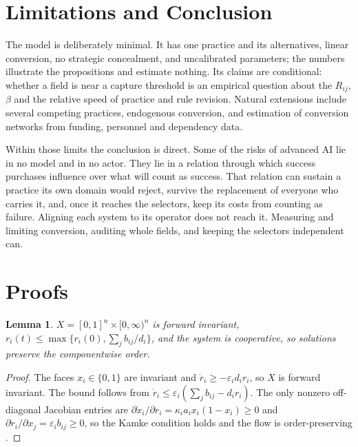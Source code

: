 \documentclass[letterpaper]{article} %
\newtheorem{lemma}{Lemma}
\theoremstyle{definition}
\begin{document}
\section{Limitations and Conclusion}

The model is deliberately minimal. It has one practice and its alternatives, linear conversion, no strategic concealment, and uncalibrated parameters; the numbers illustrate the propositions and estimate nothing. Its claims are conditional: whether a field is near a capture threshold is an empirical question about the $R_{ij}$, $\beta$ and the relative speed of practice and rule revision. Natural extensions include several competing practices, endogenous conversion, and estimation of conversion networks from funding, personnel and dependency data.

Within those limits the conclusion is direct. Some of the risks of advanced AI lie in no model and in no actor. They lie in a relation through which success purchases influence over what will count as success. That relation can sustain a practice its own domain would reject, survive the replacement of everyone who carries it, and, once it reaches the selectors, keep its costs from counting as failure. Aligning each system to its operator does not reach it. Measuring and limiting conversion, auditing whole fields, and keeping the selectors independent can.



\appendix

\section{Proofs}\label{app:proofs}

\begin{lemma}\label{lem:basic}
$X=[0,1]^n\times[0,\infty)^n$ is forward invariant, $r_i(t)\le\max\{r_i(0),\sum_jb_{ij}/d_i\}$, and the system is cooperative, so solutions preserve the componentwise order.
\end{lemma}
\begin{proof}
The faces $x_i\in\{0,1\}$ are invariant and $\dot r_i\ge-\varepsilon_id_ir_i$, so $X$ is forward invariant. The bound follows from $\dot r_i\le\varepsilon_i(\sum_jb_{ij}-d_ir_i)$. The only nonzero off-diagonal Jacobian entries are $\partial\dot x_i/\partial r_i=\kappa_ia_ix_i(1-x_i)\ge0$ and $\partial\dot r_i/\partial x_j=\varepsilon_ib_{ij}\ge0$, so the Kamke condition holds and the flow is order-preserving \citep{smith1995}.
\end{proof}
\end{document}
